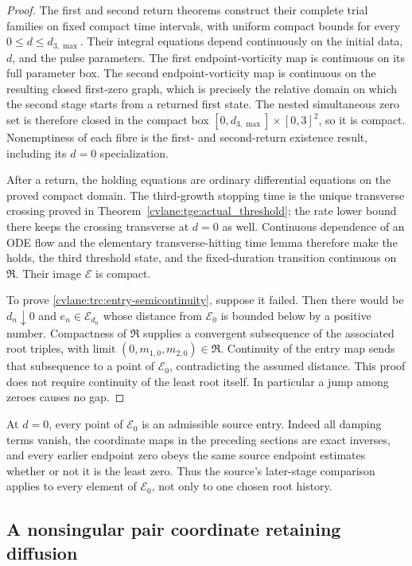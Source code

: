 \begin{proof}
The first and second return theorems construct their complete trial
families on fixed compact time intervals, with uniform compact bounds for
every $0\leq d\leq d_{3,\max}$.  Their integral equations depend
continuously on the initial data, $d$, and the pulse parameters.  The first
endpoint-vorticity map is continuous on its full parameter box.  The second
endpoint-vorticity map is continuous on the resulting closed first-zero
graph, which is precisely the relative domain on which the second stage
starts from a returned first state.  The nested simultaneous zero set is
therefore closed in the compact box
$[0,d_{3,\max}]\times[0,3]^2$, so it is compact.  Nonemptiness of each
fibre is the first- and second-return existence result, including its
$d=0$ specialization.

After a return, the holding equations are ordinary differential equations
on the proved compact domain.  The third-growth stopping time is the unique
transverse crossing proved in Theorem~\ref{cvlane:tge:actual_threshold}; the rate
lower bound there keeps the crossing transverse at $d=0$ as well.
Continuous dependence of an ODE flow and the elementary transverse-hitting
time lemma therefore make the holds, the third threshold state, and the
fixed-duration transition continuous on $\mathfrak R$.  Their image
$\mathcal E$ is compact.

To prove \eqref{cvlane:trc:entry-semicontinuity}, suppose it failed.  Then there
would be $d_n\downarrow0$ and $e_n\in\mathcal E_{d_n}$ whose distance from
$\mathcal E_0$ is bounded below by a positive number.  Compactness of
$\mathfrak R$ supplies a convergent subsequence of the associated root
triples, with limit $(0,m_{1,0},m_{2,0})\in\mathfrak R$.  Continuity of the
entry map sends that subsequence to a point of $\mathcal E_0$, contradicting
the assumed distance.  This proof does not require continuity of the least
root itself.  In particular a jump among zeroes causes no gap.
\end{proof}

At $d=0$, every point of $\mathcal E_0$ is an admissible source entry.
Indeed all damping terms vanish, the coordinate maps in the preceding
sections are exact inverses, and every earlier endpoint zero obeys the same
source endpoint estimates whether or not it is the least zero.  Thus the
source's later-stage comparison applies to every element of
$\mathcal E_0$, not only to one chosen root history.

\subsection{A nonsingular pair coordinate retaining diffusion}

